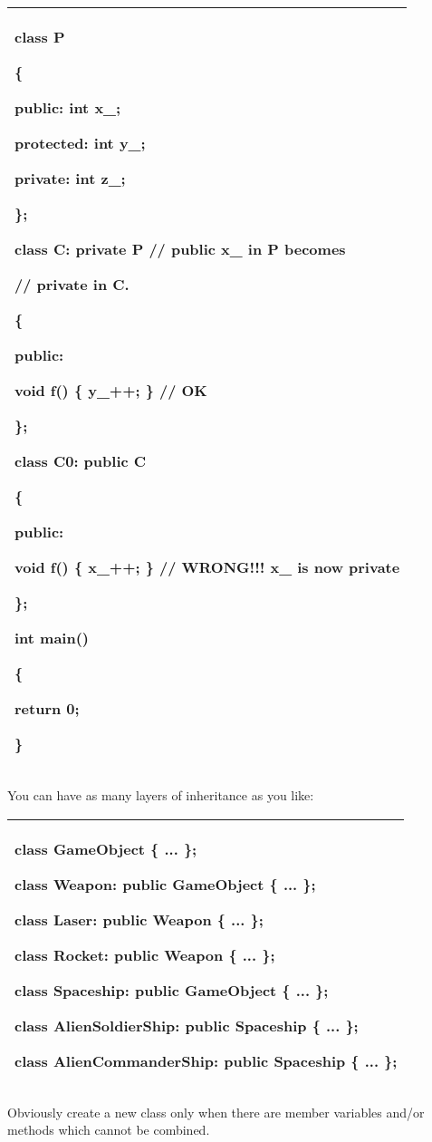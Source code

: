 \documentclass[
]{article}
\begin{document}
\begin{longtable}[]{@{}l@{}}
\toprule
\endhead
\begin{minipage}[t]{0.97\columnwidth}\raggedright
class P

\{

public: int x\_;

protected: int y\_;

private: int z\_;

\};

class C: \textbf{private P }// public x\_ in P becomes

// private in C.

\{

public:

void f() \{ y\_++; \} // OK

\};

class C0: public C

\{

public:

void f() \{ \textbf{x\_++;} \} // WRONG!!! x\_ is now private

\};

int main()

\{

return 0;

\}\strut
\end{minipage}\tabularnewline
\bottomrule
\end{longtable}

You can have as many layers of inheritance as you like:

\begin{longtable}[]{@{}l@{}}
\toprule
\endhead
\begin{minipage}[t]{0.97\columnwidth}\raggedright
class GameObject \{ ... \};

class Weapon: public GameObject \{ ... \};

class Laser: public Weapon \{ ... \};

class Rocket: public Weapon \{ ... \};

class Spaceship: public GameObject \{ ... \};

class AlienSoldierShip: public Spaceship \{ ... \};

class AlienCommanderShip: public Spaceship \{ ... \};\strut
\end{minipage}\tabularnewline
\bottomrule
\end{longtable}

Obviously create a new class only when there are member variables and/or
methods which cannot be combined.
\end{document}
